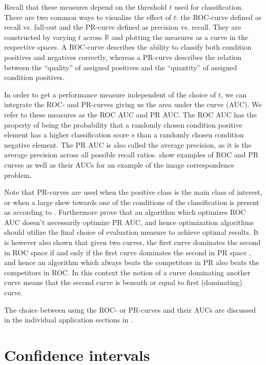 \documentclass[thesis.tex]{subfiles}
\begin{document}
Recall that these measures depend on the threshold $t$ used for classification. There are two common ways to visualize the effect of $t$: the ROC-curve defined as recall vs. fall-out and the PR-curve defined as precision vs. recall. They are constructed by varying $t$ across $\mathbb{R}$ and plotting the measures as a curve in the respective spaces. A ROC-curve describes the ability to classify both condition positives and negatives correctly, whereas a PR-curve describes the relation between the ``quality'' of assigned positives and the ``quantity'' of assigned condition positives.

In order to get a performance measure independent of the choice of $t$, we can integrate the ROC- and PR-curves giving us the area under the curve (AUC). We refer to these measures as the ROC AUC and PR AUC. The ROC AUC has the property of being the probability that a randomly chosen condition positive element has a higher classification score $s$ than a randomly chosen condition negative element. The PR AUC is also called the average precision, as it is the average precision across all possible recall ratios.  show examples of ROC and PR curves as well as their AUCs for an example of the image correspondence problem.

Note that PR-curves are used when the positive class is the main class of interest, or when a large skew towards one of the conditions of the classification is present as according to \citet{davis2006relationship}. Furthermore \citet{davis2006relationship} prove that an algorithm which optimizes ROC AUC doesn't necessarily optimize PR AUC, and hence optimization algorithms should utilize the final choice of evaluation measure to achieve optimal results. It is however also shown that given two curves, the first curve dominates the second in ROC space if and only if the first curve dominates the second in PR space \cite[Theorem 3.2]{davis2006relationship}, and hence an algorithm which always beats the competitors in PR also beats the competitors in ROC. In this context the notion of a curve dominating another curve means that the second curve is beneath or equal to first (dominating) curve.

The choice between using the ROC- or PR-curves and their AUCs are discussed in the individual application sections in .
%
\section{Confidence intervals}
\label{sec:confidenceIntervals}
\end{document}
